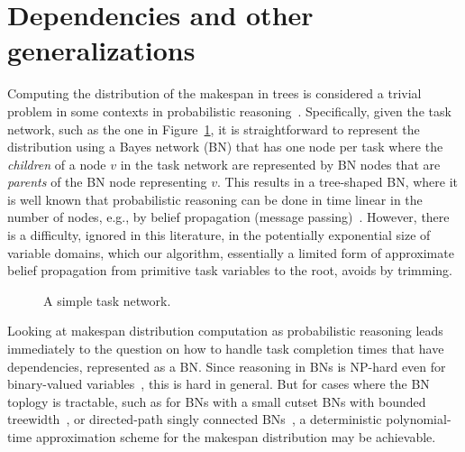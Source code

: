 \documentclass{article}
\begin{document}
\section{Dependencies and other generalizations}\label{sec:generalizations}

Computing the distribution of the makespan in trees is considered a trivial problem in some contexts
in probabilistic reasoning~\cite{Pearl}.
Specifically, given the task network, such as the one in Figure~\ref{fig:task-network},
it is straightforward to represent the 
distribution using a Bayes network (BN) that has one node
per task where the {\em children} of a node $v$ in the 
task network are represented by BN nodes that are {\em parents} of
the BN node representing $v$. This results in a tree-shaped BN, 
where it is well known that probabilistic reasoning can be done in time linear
in the number of nodes, e.g., by belief propagation (message passing)~\cite{Pearl,Kim}. 
However, there is a difficulty, ignored in this literature, in the potentially exponential size
of variable domains, which our algorithm, essentially a limited form
of approximate belief propagation from primitive task variables to the root, avoids by trimming.

\begin{figure}
\centering
{}
\caption{A simple task network.}
\label{fig:task-network}
\end{figure}

Looking at makespan distribution computation as probabilistic reasoning leads immediately to 
the question on how to handle task completion times that have dependencies, represented as a BN. 
Since reasoning in BNs is NP-hard even for binary-valued variables~\cite{Dagum.aij,Cooper.ai}, 
this is hard in general.
But for cases where the BN toplogy is tractable, such as for BNs with a small cutset %
BNs with bounded treewidth~\cite{Bodlaender:2006:TCA:2092758.2092759},
or directed-path singly connected BNs~\cite{ShimonyDomshlak.aiRN2003},
a deterministic polynomial-time approximation scheme for 
the makespan distribution may be achievable.
\end{document}
